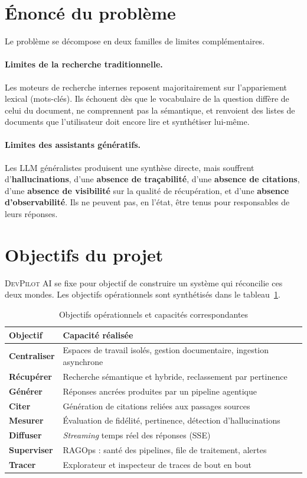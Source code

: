 \documentclass[12pt,a4paper,oneside]{report}
\newcommand{\devpilot}{\textsc{DevPilot AI}}
\begin{document}
\section{Énoncé du problème}
Le problème se décompose en deux familles de limites complémentaires.

\paragraph{Limites de la recherche traditionnelle.} Les moteurs de recherche
internes reposent majoritairement sur l'appariement lexical (mots-clés). Ils
échouent dès que le vocabulaire de la question diffère de celui du document, ne
comprennent pas la sémantique, et renvoient des listes de documents que
l'utilisateur doit encore lire et synthétiser lui-même.

\paragraph{Limites des assistants génératifs.} Les LLM généralistes produisent une
synthèse directe, mais souffrent d'\textbf{hallucinations}, d'une \textbf{absence
de traçabilité}, d'une \textbf{absence de citations}, d'une \textbf{absence de
visibilité} sur la qualité de récupération, et d'une \textbf{absence
d'observabilité}. Ils ne peuvent pas, en l'état, être tenus pour responsables de
leurs réponses.

\section{Objectifs du projet}
\devpilot{} se fixe pour objectif de construire un système qui réconcilie ces deux
mondes. Les objectifs opérationnels sont synthétisés dans le tableau~\ref{tab:objectifs}.

\begin{table}[H]
\centering
\caption{Objectifs opérationnels et capacités correspondantes}
\label{tab:objectifs}
\small
\begin{tabularx}{\textwidth}{@{}>{\bfseries}l X@{}}
\toprule
Objectif & Capacité réalisée \\
\midrule
Centraliser & Espaces de travail isolés, gestion documentaire, ingestion asynchrone \\
Récupérer & Recherche sémantique et hybride, reclassement par pertinence \\
Générer & Réponses ancrées produites par un pipeline agentique \\
Citer & Génération de citations reliées aux passages sources \\
Mesurer & Évaluation de fidélité, pertinence, détection d'hallucinations \\
Diffuser & \emph{Streaming} temps réel des réponses (SSE) \\
Superviser & RAGOps : santé des pipelines, file de traitement, alertes \\
Tracer & Explorateur et inspecteur de traces de bout en bout \\
\bottomrule
\end{tabularx}
\end{table}
\end{document}
